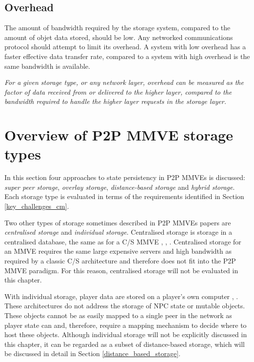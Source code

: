 \subsection{Overhead}
\label{characteristics_overhead}

The amount of bandwidth required by the storage system, compared to the amount of objet data stored, should be low. Any networked communications protocol should attempt to limit its overhead. A system with low overhead has a faster effective data transfer rate, compared to a system with high overhead is the same bandwidth is available.

\emph{For a given storage type, or any network layer, overhead can be measured as the factor of data received from or delivered to the higher layer, compared to the bandwidth required to handle the higher layer requests in the storage layer.}

\section{Overview of P2P MMVE storage types}
\label{storage_type_overview}

In this section four approaches to state persistency in P2P MMVEs is discussed: \emph{super peer storage}, \emph{overlay storage}, \emph{distance-based storage} and \emph{hybrid storage}. Each storage type is evaluated in terms of the requirements identified in Section \ref{key_challenges_cm}.

Two other types of storage sometimes described in P2P MMVEs papers are \emph{centralised storage} and \emph{individual storage}. Centralised storage is storage in a centralised database, the same as for a C/S MMVE \cite{badumna_engine}, \cite{rooney_centralised_storage}, \cite{hybrid_p2p_cs_centralised}. Centralised storage for an MMVE requires the same large expensive servers and high bandwidth as required by a classic C/S architecture and therefore does not fit into the P2P MMVE paradigm. For this reason, centralised storage will not be evaluated in this chapter.

With individual storage, player data are stored on a player's own computer  \cite{individual_storage1}, \cite{cheat_proof_playout}. These architectures do not address the storage of NPC state or mutable objects. These objects cannot be as easily mapped to a single peer in the network as player state can and, therefore, require a mapping mechanism to decide where to host these objects. Although individual storage will not be explicitly discussed in this chapter, it can be regarded as a subset of distance-based storage, which will be discussed in detail in Section \ref{distance_based_storage}.

